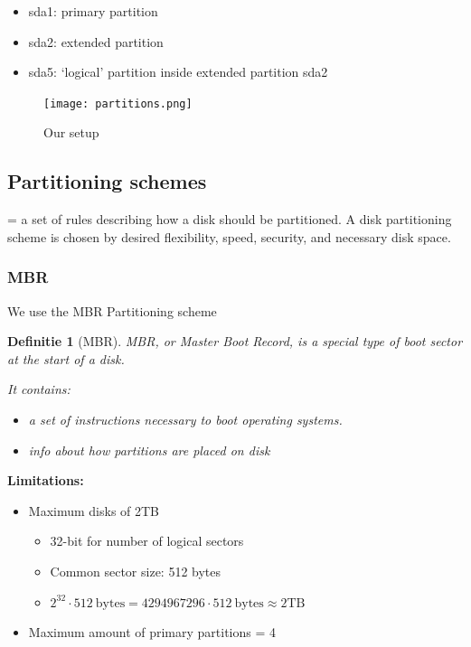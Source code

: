 \documentclass{article}
\newtheorem{theorem}{Definitie}[section]
\begin{document}
\begin{itemize}
    \item sda1: primary partition
    \item sda2: extended partition
    \item sda5: `logical' partition inside extended partition sda2
\end{itemize}

\begin{figure}[H]
    \centering
    \texttt{[image: partitions.png]}
    \caption{Our setup}
\end{figure}

\subsection{Partitioning schemes}

= a set of rules describing how a disk should be partitioned.
A disk partitioning scheme is chosen by desired flexibility, speed, security, and necessary disk space.

\subsubsection{MBR}

We use the MBR Partitioning scheme

\begin{theorem}[MBR]
MBR, or Master Boot Record, is a special type of boot sector at the start of a disk.

It contains: 

\begin{itemize}
    \item a set of instructions necessary to boot operating systems.
    \item info about how partitions are placed on disk
\end{itemize}


\end{theorem}

\textbf{Limitations:}

\begin{itemize}
    \item Maximum disks of 2TB
    \begin{itemize}
        \item 32-bit for number of logical sectors
        \item Common sector size: 512 bytes
        \item $2^{32} \cdot 512\ \text{bytes} = 4294967296 \cdot 512\ \text{bytes} \approx 2\text{TB}$
    \end{itemize}
    \item Maximum amount of primary partitions = 4
\end{itemize}
\end{document}
